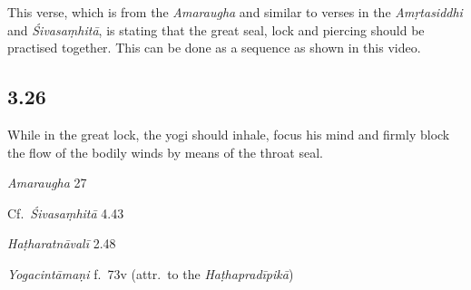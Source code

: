\begin{ekdosis}
\begin{philcomm}[hp03_025]
This verse, which is from the \emph{Amaraugha} and similar to verses in the \emph{Amṛtasiddhi} and \emph{Śivasaṃhitā}, is stating that the great seal, lock and piercing should be practised together. This can be done as a sequence as shown in this video. %
\end{philcomm}

\subsection*{3.26}
\begin{translation}[hp03_026]
While in the great lock, the yogi should inhale, focus his mind and firmly block the flow of the bodily winds by means of the throat seal.
\end{translation}

\begin{sources}[hp03_026]
\emph{Amaraugha} 27
\begin{versinnote}
\tl{\var{ārudhya ] āvṛtya, āśritya \vl}\\!}
\end{versinnote}

Cf.~\emph{Śivasaṃhitā}  4.43
\begin{versinnote}
\end{versinnote}
\end{sources}

\begin{testimonia}[hp03_026]
\emph{Haṭharatnāvalī} 2.48
\begin{versinnote}
\tl{\var{ekadhīḥ ] ekadhā \vl}\\!}
\end{versinnote}

\emph{Yogacintāmaṇi} f.~73v (attr.~to the \emph{Haṭhapradīpikā})
\begin{versinnote}
\end{versinnote}


\end{testimonia}
\end{ekdosis}
